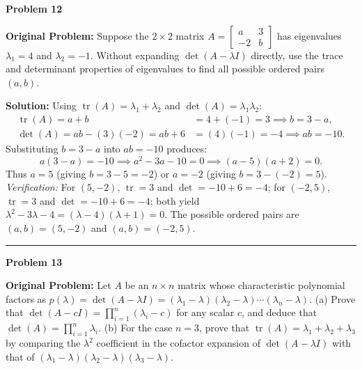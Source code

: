 \documentclass[11pt, letterpaper]{article}
\theoremstyle{definition}
\theoremstyle{remark}
\begin{document}
\noindent\textbf{Problem 12}

\textbf{Original Problem:} Suppose the $2 \times 2$ matrix $A = \begin{bmatrix} a & 3 \\ -2 & b \end{bmatrix}$ has eigenvalues $\lambda_1 = 4$ and $\lambda_2 = -1$. Without expanding $\det(A - \lambda I)$ directly, use the trace and determinant properties of eigenvalues to find all possible ordered pairs $(a, b)$.

\textbf{Solution:} Using $\operatorname{tr}(A) = \lambda_1 + \lambda_2$ and $\det(A) = \lambda_1\lambda_2$:
\begin{align*}
\operatorname{tr}(A) = a + b &= 4 + (-1) = 3 \implies b = 3 - a, \\
\det(A) = ab - (3)(-2) = ab + 6 &= (4)(-1) = -4 \implies ab = -10.
\end{align*}
Substituting $b = 3 - a$ into $ab = -10$ produces:
\[
a(3 - a) = -10 \implies a^2 - 3a - 10 = 0 \implies (a - 5)(a + 2) = 0.
\]
Thus $a = 5$ (giving $b = 3 - 5 = -2$) or $a = -2$ (giving $b = 3 - (-2) = 5$).
\textit{Verification:} For $(5, -2)$, $\operatorname{tr} = 3$ and $\det = -10 + 6 = -4$; for $(-2, 5)$, $\operatorname{tr} = 3$ and $\det = -10 + 6 = -4$; both yield $\lambda^2 - 3\lambda - 4 = (\lambda - 4)(\lambda + 1) = 0$.
The possible ordered pairs are $(a, b) = (5, -2)$ and $(a, b) = (-2, 5)$.

\noindent\rule{\textwidth}{0.4pt}

\noindent\textbf{Problem 13}

\textbf{Original Problem:} Let $A$ be an $n \times n$ matrix whose characteristic polynomial factors as $p(\lambda) = \det(A - \lambda I) = (\lambda_1 - \lambda)(\lambda_2 - \lambda)\cdots(\lambda_n - \lambda)$.
(a) Prove that $\det(A - cI) = \prod_{i=1}^{n}(\lambda_i - c)$ for any scalar $c$, and deduce that $\det(A) = \prod_{i=1}^{n}\lambda_i$.
(b) For the case $n = 3$, prove that $\operatorname{tr}(A) = \lambda_1 + \lambda_2 + \lambda_3$ by comparing the $\lambda^2$ coefficient in the cofactor expansion of $\det(A - \lambda I)$ with that of $(\lambda_1 - \lambda)(\lambda_2 - \lambda)(\lambda_3 - \lambda)$.
\end{document}

